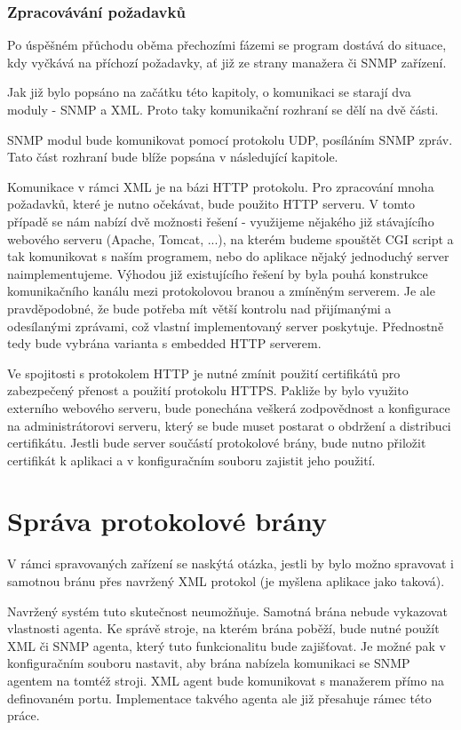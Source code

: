 \subsubsection{Zpracovávání požadavků}
Po úspěšném přůchodu oběma přechozími fázemi se program dostává do situace, kdy vyčkává na příchozí požadavky, ať již ze strany manažera či SNMP zařízení.

Jak již bylo popsáno na začátku této kapitoly, o komunikaci se starají dva moduly - SNMP a XML. Proto taky komunikační rozhraní se dělí na dvě části.

SNMP modul bude komunikovat pomocí protokolu UDP, posíláním SNMP zpráv. Tato část rozhraní bude blíže popsána v následující kapitole.

Komunikace v rámci XML je na bázi HTTP protokolu. Pro zpracování mnoha požadavků, které je nutno očekávat, bude použito HTTP serveru. V tomto případě se nám nabízí dvě možnosti
řešení - využijeme nějakého již stávajícího webového serveru (Apache, Tomcat, ...), na kterém budeme spouštět CGI script a tak komunikovat s naším programem, nebo do aplikace nějaký jednoduchý server
naimplementujeme. Výhodou již existujícího řešení by byla pouhá konstrukce komunikačního kanálu mezi protokolovou branou a zmíněným serverem. Je ale pravděpodobné, že bude potřeba mít větší kontrolu
nad přijímanými a odesílanými zprávami, což vlastní implementovaný server poskytuje. Přednostně tedy bude vybrána varianta s embedded HTTP serverem.

Ve spojitosti s protokolem HTTP je nutné zmínit použití certifikátů pro zabezpečený přenost a použití protokolu HTTPS. Pakliže by bylo využito externího webového serveru, bude ponechána
veškerá zodpovědnost a konfigurace na administrátorovi serveru, který se bude muset postarat o obdržení a distribuci certifikátu. Jestli bude server součástí protokolové brány, bude
nutno přiložit certifikát k aplikaci a v konfiguračním souboru zajistit jeho použití.

\section{Správa protokolové brány}
V rámci spravovaných zařízení se naskýtá otázka, jestli by bylo možno spravovat i samotnou bránu přes navržený XML protokol (je myšlena aplikace jako taková). 

Navržený systém tuto skutečnost neumožňuje. Samotná brána nebude vykazovat vlastnosti agenta. Ke správě stroje, na kterém brána poběží, bude nutné použít XML či SNMP agenta, který tuto 
funkcionalitu bude zajišťovat. Je možné pak v konfiguračním souboru nastavit, aby brána nabízela komunikaci se SNMP agentem na tomtéž stroji. XML agent bude komunikovat s manažerem přímo na definovaném portu.
Implementace takvého agenta ale již přesahuje rámec této práce.

